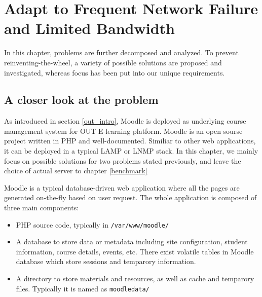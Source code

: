 \chapter{Adapt to Frequent Network Failure and Limited Bandwidth}\label{sync}
In this chapter, problems are further decomposed and analyzed. To prevent reinventing-the-wheel, a variety of possible solutions are proposed and investigated, whereas focus has been put into our unique requirements.




\section{A closer look at the problem} \label{components}
As introduced in section \ref{out_intro}, Moodle is deployed as underlying course management system for OUT E-learning platform. Moodle is an open sourse project written in PHP and well-documented\cite{aosamoodle}\cite{moodledoc}. Similiar to other web applications, it can be deployed in a typical LAMP or LNMP stack. In this chapter, we mainly focus on possible solutions for two problems stated previously, and leave the choice of actual server to chapter \ref{benchmark}

Moodle is a typical database-driven web application where all the pages are generated on-the-fly based on user request. The whole application is composed of three main components: 
\begin{itemize}
\item PHP source code, typically in \texttt{/var/www/moodle/}
\item A database to store data or metadata including site configuration, student information, course details, events, etc. There exist volatile tables in Moodle database which store sessions and temparory information.
\item A directory to store materials and resources, as well as cache and temparory files. Typically it is named as \texttt{moodledata/}
\end{itemize}

